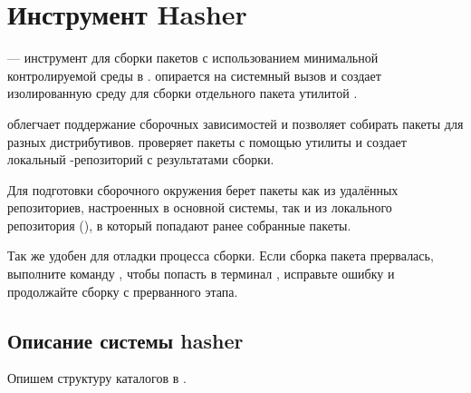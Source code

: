 \chapter{Инструмент Hasher}\label{chapter-hasher}
 --- инструмент для сборки пакетов с использованием минимальной контролируемой среды в .  опирается на системный вызов  и создает изолированную среду для сборки отдельного пакета утилитой .

 облегчает поддержание сборочных зависимостей и позволяет собирать пакеты для разных дистрибутивов.  проверяет пакеты с помощью утилиты  и создает локальный -репозиторий с результатами сборки.

Для подготовки сборочного окружения  берет пакеты как из удалённых репозиториев, настроенных в основной системы, так и из локального репозитория (), в который попадают ранее собранные пакеты.

Так же  удобен для отладки процесса сборки. Если сборка пакета прервалась, выполните команду , чтобы попасть в терминал , исправьте ошибку и продолжайте сборку с прерванного этапа.


\section{Описание системы hasher}
Опишем структуру каталогов в .

